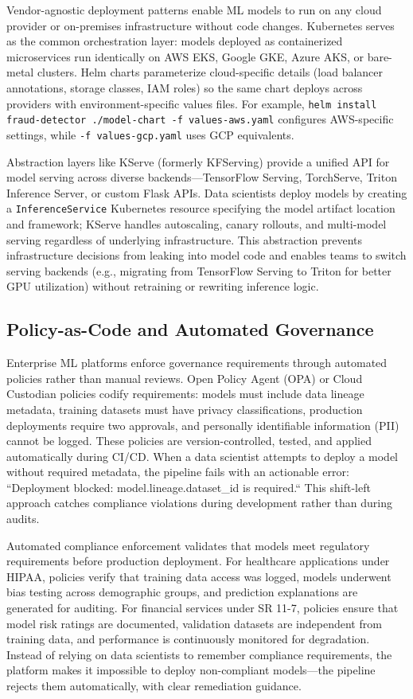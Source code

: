 Vendor-agnostic deployment patterns enable ML models to run on any cloud provider or on-premises infrastructure without code changes. Kubernetes serves as the common orchestration layer: models deployed as containerized microservices run identically on AWS EKS, Google GKE, Azure AKS, or bare-metal clusters. Helm charts parameterize cloud-specific details (load balancer annotations, storage classes, IAM roles) so the same chart deploys across providers with environment-specific values files. For example, \texttt{helm install fraud-detector ./model-chart -f values-aws.yaml} configures AWS-specific settings, while \texttt{-f values-gcp.yaml} uses GCP equivalents.

Abstraction layers like KServe (formerly KFServing) provide a unified API for model serving across diverse backends---TensorFlow Serving, TorchServe, Triton Inference Server, or custom Flask APIs. Data scientists deploy models by creating a \texttt{InferenceService} Kubernetes resource specifying the model artifact location and framework; KServe handles autoscaling, canary rollouts, and multi-model serving regardless of underlying infrastructure. This abstraction prevents infrastructure decisions from leaking into model code and enables teams to switch serving backends (e.g., migrating from TensorFlow Serving to Triton for better GPU utilization) without retraining or rewriting inference logic.

\subsection{Policy-as-Code and Automated Governance}

Enterprise ML platforms enforce governance requirements through automated policies rather than manual reviews. Open Policy Agent (OPA) or Cloud Custodian policies codify requirements: models must include data lineage metadata, training datasets must have privacy classifications, production deployments require two approvals, and personally identifiable information (PII) cannot be logged. These policies are version-controlled, tested, and applied automatically during CI/CD. When a data scientist attempts to deploy a model without required metadata, the pipeline fails with an actionable error: ``Deployment blocked: model.lineage.dataset\_id is required.`` This shift-left approach catches compliance violations during development rather than during audits.

Automated compliance enforcement validates that models meet regulatory requirements before production deployment. For healthcare applications under HIPAA, policies verify that training data access was logged, models underwent bias testing across demographic groups, and prediction explanations are generated for auditing. For financial services under SR 11-7, policies ensure that model risk ratings are documented, validation datasets are independent from training data, and performance is continuously monitored for degradation. Instead of relying on data scientists to remember compliance requirements, the platform makes it impossible to deploy non-compliant models---the pipeline rejects them automatically, with clear remediation guidance.

